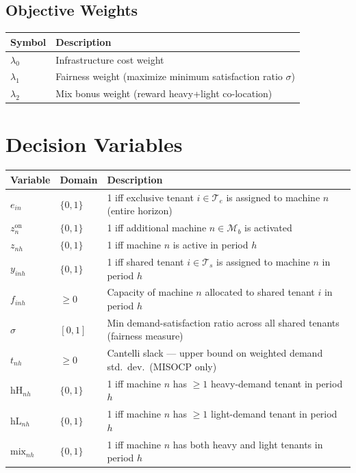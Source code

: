 \documentclass[11pt,a4paper]{article}
\newcommand{\Te}{\mathcal{T}_e}
\newcommand{\Ts}{\mathcal{T}_s}
\newcommand{\Mb}{\mathcal{M}_b}
\begin{document}
\subsection*{Objective Weights}
\begin{center}
\begin{tabular}{p{2.5cm} p{10cm}}
\toprule
Symbol & Description \\
\midrule
$\lambda_0$ & Infrastructure cost weight \\
$\lambda_1$ & Fairness weight (maximize minimum satisfaction ratio $\sigma$) \\
$\lambda_2$ & Mix bonus weight (reward heavy+light co-location) \\
\bottomrule
\end{tabular}
\end{center}

\section{Decision Variables}

\begin{center}
\begin{tabular}{p{3.8cm} p{1.8cm} p{8.5cm}}
\toprule
Variable & Domain & Description \\
\midrule
$e_{in}$ & $\{0,1\}$ &
  1 iff exclusive tenant $i\in\Te$ is assigned to machine $n$ (entire horizon) \\
$z^{\mathrm{on}}_n$ & $\{0,1\}$ &
  1 iff additional machine $n\in\Mb$ is activated \\
$z_{nh}$ & $\{0,1\}$ &
  1 iff machine $n$ is active in period $h$ \\
$y_{inh}$ & $\{0,1\}$ &
  1 iff shared tenant $i\in\Ts$ is assigned to machine $n$ in period $h$ \\
$f_{inh}$ & $\geq 0$ &
  Capacity of machine $n$ allocated to shared tenant $i$ in period $h$ \\
$\sigma$ & $[0,1]$ &
  Min demand-satisfaction ratio across all shared tenants (fairness measure) \\
$t_{nh}$ & $\geq 0$ &
  Cantelli slack — upper bound on weighted demand std.\ dev.\ (MISOCP only) \\
$\mathrm{hH}_{nh}$ & $\{0,1\}$ &
  1 iff machine $n$ has $\geq 1$ heavy-demand tenant in period $h$ \\
$\mathrm{hL}_{nh}$ & $\{0,1\}$ &
  1 iff machine $n$ has $\geq 1$ light-demand tenant in period $h$ \\
$\mathrm{mix}_{nh}$ & $\{0,1\}$ &
  1 iff machine $n$ has both heavy and light tenants in period $h$ \\
\bottomrule
\end{tabular}
\end{center}
\end{document}
